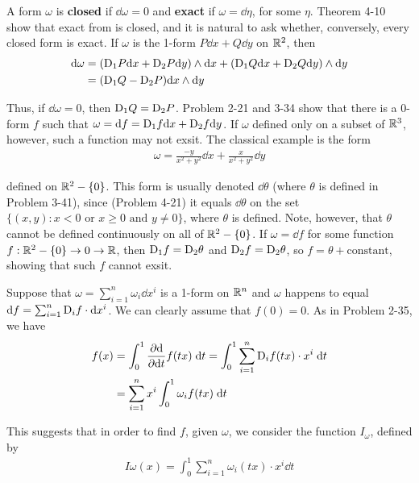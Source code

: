 A form $\omega$ is \textbf{closed} if $\dd\omega = 0$ and \textbf{exact} if $\omega=\dd\eta$,
for some $\eta$. Theorem 4-10 show that exact from is closed, and it is natural to ask whether,
conversely, every closed form is exact. If $\omega$ is the 1-form $P\dd x + Q\dd y$ on $\mathbb{R}^2$, 
then 
\begin{align*}
    \mathrm{d}\omega
    & = (\mathrm{D}_1P\mathrm{d} x + \mathrm{D}_2P\mathrm{d} y)\wedge\mathrm{d} x + (\mathrm{D}_1Q\mathrm{d} x + \mathrm{D}_2Q\mathrm{d} y)\wedge\mathrm{d} y \\
    & = (\mathrm{D}_1Q - \mathrm{D}_2P)\mathrm{d} x\wedge\mathrm{d} y
\end{align*}

Thus, if $\dd\omega=0$, then $\mathrm{D}_1Q = \mathrm{D}_2P$. Problem 2-21 and 3-34 show that there is 
a 0-form $f$ such that $\omega=\mathrm{d} f=\mathrm{D}_1f\mathrm{d} x+ \mathrm{D}_2f\mathrm{d} y$. If $\omega$ defined only 
on a subset of $\mathbb{R}^3$, however, such a function may not exsit. The classical example is the 
form 
\begin{align*}
    \omega = \frac{-y}{x^2+y^2}\dd x + \frac{x}{x^2+y^2}\dd y
\end{align*}

defined on $\mathbb{R}^2-\{0\}$. This form is usually denoted $\dd\theta$ (where $\theta$ is defined in Problem 3-41),
since (Problem 4-21) it equals $\dd\theta$ on the set $\{(x,y):x<0\text{ or } x\ge 0\text{ and }y\neq 0\}$,
where $\theta$ is defined. Note, however, that $\theta$ cannot be defined continuously on all of $\mathbb{R}^2-\{0\}$.
If $\omega=\dd f$ for some function $f:\mathbb{R}^2-\{0\}\to 0\to \mathbb{R}$, then $\mathrm{D}_1f = \mathrm{D}_2\theta$ and 
$\mathrm{D}_2f = \mathrm{D}_2\theta$, so $f=\theta + \text{constant}$, showing that such $f$ cannot exsit.

Suppose that $\omega=\sum_{i=1}^n\omega_i\dd x^i$ is a 1-form on $\mathbb{R}^n$ and $\omega$ happens to equal 
$\mathrm{d} f=\sum_{i=1}^{n}{\mathrm{D}_if\cdot \mathrm{d} x^i}$. We can clearly assume that $f(0)=0$. As in Problem 2-35, we have 
\begin{align*}
    f(x) 
    & = \int_{0}^{1}{\frac{\partial \mathrm{d} }{\partial \mathrm{d} t }f(tx) \;\mathrm{d} t}
        = \int_{0}^{1}{\sum_{i=1}^{n}{\mathrm{D}_i f(tx)\cdot x^i \;\mathrm{d} t}} \\
    & = \sum_{i=1}^{n}{x^i\int_{0}^{1}{\omega_i f(tx)\;\mathrm{d} t}}
\end{align*}

This suggests that in order to find $f$, given $\omega$, we consider the
function $I_\omega$, defined by 
\begin{align*}
    I\omega(x)=\int_0^1\sum_{i=1}^n\omega_i(tx)\cdot x^i\dd t
\end{align*}

